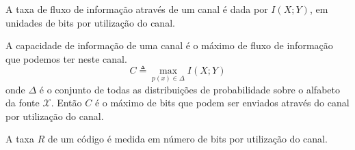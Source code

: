 \begin{frame}[allowframebreaks]
  \begin{definition}
  A taxa de fluxo de informação através de um canal é dada por $I(X;Y)$, em unidades de bits por utilização do canal.
  \end{definition}

  \framebreak

  \begin{definition}[capacidade]
  A capacidade de informação de uma canal é o máximo de fluxo de informação que podemos ter neste canal.
	\begin{equation}
	C \triangleq \max_{p(x) \in \Delta} I(X;Y)
	\end{equation}
  onde $\Delta$ é o conjunto de todas as distribuições de probabilidade sobre o alfabeto da fonte $\mathcal{X}$.
  Então $C$ é o máximo de bits que podem ser enviados através do canal por utilização do canal.
  \end{definition}

  \begin{definition}[taxa]
  A taxa $R$ de um código é medida em número de bits por utilização do canal.
  \end{definition}

\end{frame}


